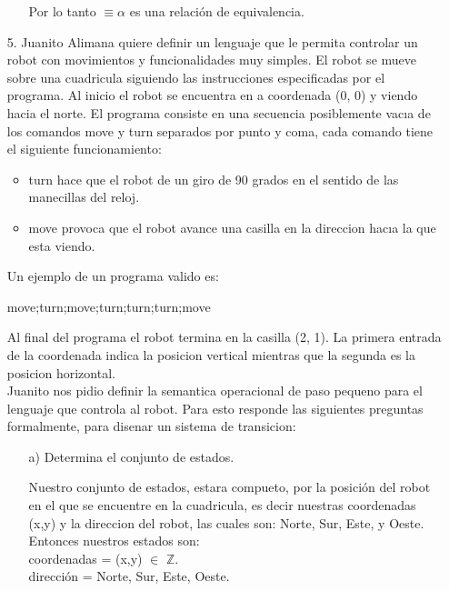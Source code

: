 \documentclass{article}
\begin{document}
\begin{itemize}
\begin{itemize}
        Por lo tanto $\equiv\alpha$ es una relación de equivalencia.\\
            \end{itemize}
        \item[5.] Juanito Alimana quiere definir un lenguaje que le permita controlar un robot con movimientos y funcionalidades muy simples. El robot se mueve sobre una cuadricula siguiendo las instrucciones especificadas por el programa. Al inicio el robot se encuentra en a coordenada (0, 0) y viendo hacia el norte. El programa consiste en una secuencia posiblemente vacıa de los comandos move y turn separados por punto y coma, cada comando tiene el siguiente funcionamiento:
            \begin{itemize}
                \item turn hace que el robot de un giro de 90 grados en el sentido de las manecillas del reloj.
                \item move provoca que el robot avance una casilla en la direccion hacıa la que esta viendo.
            \end{itemize}
            Un ejemplo de un programa valido es:
            \begin{center}
                move;turn;move;turn;turn;turn;move
            \end{center}

            Al final del programa el robot termina en la casilla (2, 1). La primera entrada de la coordenada
            indica la posicion vertical mientras que la segunda es la posicion horizontal.\\ 
            Juanito nos pidio definir la semantica operacional de paso pequeno para el lenguaje que controla al robot. Para esto responde las siguientes preguntas formalmente, para disenar un sistema de transicion:
                \begin{itemize}
                    \item[a)] Determina el conjunto de estados.

                    Nuestro conjunto de estados, estara compueto, por la posición del robot en el que se encuentre en la cuadricula, es decir nuestras coordenadas (x,y) y la direccion del robot, las cuales son: Norte, Sur, Este, y Oeste.\\

                    Entonces nuestros estados son:\\
                
                    coordenadas = (x,y) $\in$ $\mathbb Z$.\\
                    dirección = Norte, Sur, Este, Oeste.\\
                    

\end{itemize}
\end{itemize}
\end{document}
